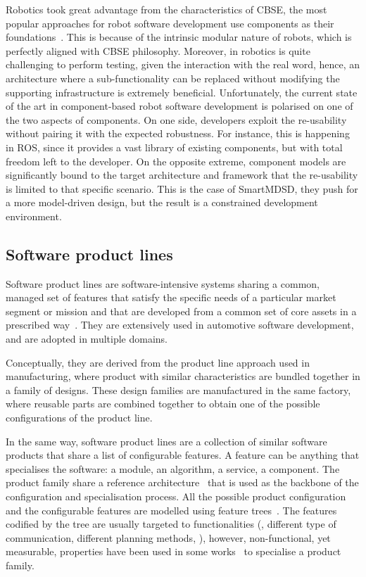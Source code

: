 Robotics took great advantage from the characteristics of CBSE, the most popular approaches for robot software development use components as their foundations~\cite{brugali2009component, brugali2010component}. This is because of the intrinsic modular nature of robots, which is perfectly aligned with CBSE philosophy. Moreover, in robotics is quite challenging to perform testing, given the interaction with the real word, hence, an architecture where a sub-functionality can be replaced without modifying the supporting infrastructure is extremely beneficial. Unfortunately, the current state of the art in component-based robot software development is polarised on one of the two aspects of components. On one side, developers exploit the re-usability without pairing it with the expected robustness. For instance, this is happening in ROS, since it provides a vast library of existing components, but with total freedom left to the developer. On the opposite extreme, component models are significantly bound to the target architecture and framework that the re-usability is limited to that specific scenario. This is the case of SmartMDSD, they push for a more model-driven design, but the result is a constrained development environment. 

\subsection{Software product lines}
Software product lines are software-intensive systems sharing a common, managed set of features that satisfy the specific needs of a particular market segment or mission and that are developed from a common set of core assets in a prescribed way~\cite{northrop2002sei}. They are extensively used in automotive software development, and are adopted in multiple domains.

Conceptually, they are derived from the product line approach used in manufacturing, where product with similar characteristics are bundled together in a family of designs. These design families are manufactured in the same factory, where reusable parts are combined together to obtain one of the possible configurations of the product line.

In the same way, software product lines are a collection of similar software products that share a list of configurable features. A feature can be anything that specialises the software: a module, an algorithm, a service, a component. The product family share a reference architecture~\cite{nakagawa2011reference} that is used as the backbone of the configuration and specialisation process. All the possible product configuration and the configurable features are modelled using feature trees~\cite{mendonca2009splot, eriksson2009managing}. The features codified by the tree are usually targeted to functionalities (\eg, different type of communication, different planning methods, \etc), however, non-functional, yet measurable, properties have been used in some works~\cite{benavides2005automated} to specialise a product family.

